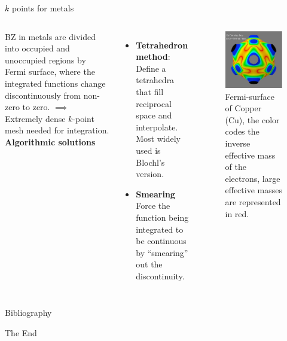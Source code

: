 \documentclass[aspectratio=169]{beamer}
\begin{document}
\begin{frame}{$k$ points for metals}
\begin{columns}
BZ in metals are divided into occupied and unoccupied regions by Fermi surface, where the integrated functions change discontinuously from non-zero to zero. $\implies$ Extremely dense $k$-point mesh needed for integration.
\textbf{Algorithmic solutions}
\begin{itemize}
    \item \textbf{Tetrahedron method}: Define a tetrahedra that fill reciprocal space and interpolate. Most widely used is Blochl's version.
    \item \textbf{Smearing} Force the function being integrated to be continuous by ``smearing'' out the discontinuity.
\end{itemize}

\begin{figure}
    \centering
    \includegraphics[width=0.6\linewidth]{lectures/figures/7_Cu_fermi_surface.png}
    \caption{Fermi-surface of Copper (Cu), the color codes the inverse effective mass of the electrons, large effective masses are represented in red.\cite{weismannSeeingFermiSurface2009}}
\end{figure} 

\end{columns} 
\end{frame} 


    \begin{frame}[allowframebreaks]{Bibliography}
        
        
    \end{frame}



    \begin{frame}
        \Huge{\centerline{The End}}
    \end{frame}
\end{document}
